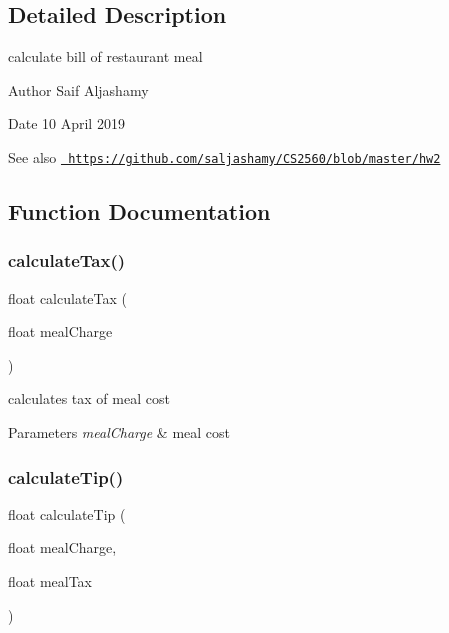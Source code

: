 \subsection{Detailed Description}
calculate bill of restaurant meal 

\begin{DoxyAuthor}{Author}
Saif Aljashamy 
\end{DoxyAuthor}
\begin{DoxyDate}{Date}
10 April 2019 
\end{DoxyDate}
\begin{DoxySeeAlso}{See also}
\href{https://github.com/saljashamy/CS2560/blob/master/hw2}{\texttt{ https\+://github.\+com/saljashamy/\+C\+S2560/blob/master/hw2}} 
\end{DoxySeeAlso}


\subsection{Function Documentation}
\mbox{\label{1-restaurant-bill_8c_a6b24de031ca99a0780eb38f582ce99ed}} 
\subsubsection{\texorpdfstring{calculateTax()}{calculateTax()}}
{\footnotesize\ttfamily float calculate\+Tax (\begin{DoxyParamCaption}\item[{float}]{meal\+Charge }\end{DoxyParamCaption})}



calculates tax of meal cost 


\begin{DoxyParams}{Parameters}
{\em meal\+Charge} & meal cost \\
\hline
\end{DoxyParams}
\mbox{\label{1-restaurant-bill_8c_a4ada15172b3913664688ef59b515fb33}} 
\subsubsection{\texorpdfstring{calculateTip()}{calculateTip()}}
{\footnotesize\ttfamily float calculate\+Tip (\begin{DoxyParamCaption}\item[{float}]{meal\+Charge,  }\item[{float}]{meal\+Tax }\end{DoxyParamCaption})}



